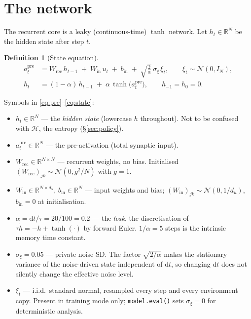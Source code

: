 \documentclass[11pt]{article}
\newtheorem{definition}{Definition}
\newcommand{\R}{\mathbb{R}}
\newcommand{\1}{\mathbf{1}}
\begin{document}
\section{The network}\label{sec:net}

The recurrent core is a leaky (continuous-time) $\tanh$ network. Let $h_t \in \R^{N}$ be the
hidden state after step $t$.

\begin{definition}[State equation]
\begin{align}
  a_t^{\mathrm{pre}} &= W_{\mathrm{rec}}\, h_{t-1} \;+\; W_{\mathrm{in}}\, u_t \;+\; b_{\mathrm{in}}
    \;+\; \sqrt{\tfrac{2}{\alpha}}\,\sigma_{\!\xi}\,\xi_t,
    \qquad \xi_t \sim \mathcal{N}(0, I_N), \label{eq:pre}\\[2pt]
  h_t &= (1-\alpha)\, h_{t-1} \;+\; \alpha\, \tanh\!\bigl(a_t^{\mathrm{pre}}\bigr),
    \qquad h_{-1} = h_0 = 0. \label{eq:state}
\end{align}
\end{definition}

\noindent Symbols in \eqref{eq:pre}--\eqref{eq:state}:
\begin{itemize}
  \item $h_t \in \R^{N}$ --- the \emph{hidden state} (lowercase $h$ throughout). Not to be
        confused with $\mathcal{H}$, the entropy (\S\ref{sec:policy}).
  \item $a_t^{\mathrm{pre}} \in \R^{N}$ --- the pre-activation (total synaptic input).
  \item $W_{\mathrm{rec}} \in \R^{N\times N}$ --- recurrent weights, no bias. Initialised
        $(W_{\mathrm{rec}})_{jk} \sim \mathcal{N}(0, g^2/N)$ with $g=1$.
  \item $W_{\mathrm{in}} \in \R^{N\times d_u}$, $b_{\mathrm{in}} \in \R^{N}$ --- input weights
        and bias; $(W_{\mathrm{in}})_{jk}\sim\mathcal{N}(0,1/d_u)$, $b_{\mathrm{in}} = 0$ at
        initialisation.
  \item $\alpha = \mathrm{d}t/\tau = 20/100 = 0.2$ --- the \emph{leak}, the discretisation of
        $\tau \dot{h} = -h + \tanh(\cdot)$ by forward Euler. $1/\alpha = 5$ steps is the
        intrinsic memory time constant.
  \item $\sigma_{\!\xi} = 0.05$ --- private noise SD. The factor $\sqrt{2/\alpha}$ makes the
        stationary variance of the noise-driven state independent of $\mathrm{d}t$, so
        changing $\mathrm{d}t$ does not silently change the effective noise level.
  \item $\xi_t$ --- i.i.d.\ standard normal, resampled every step and every environment copy.
        Present in training mode only; \texttt{model.eval()} sets $\sigma_{\!\xi}=0$ for
        deterministic analysis.
\end{itemize}
\end{document}
